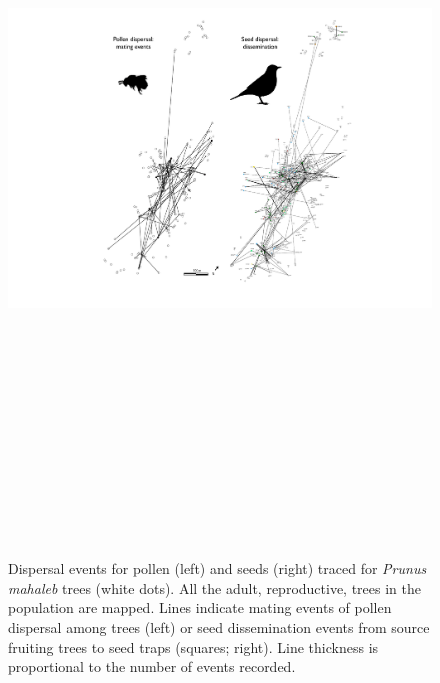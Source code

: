\documentclass[a4paper, 12pt]{article}}
\begin{document}
\begin{figure}[htbp]
\centerline{\includegraphics[height=21cm]{FigS1.pdf}}
%
\caption{Dispersal events for pollen (left) and seeds (right) traced for \textit{Prunus mahaleb} trees (white dots). All the adult, reproductive, trees in the population are mapped. Lines indicate mating events of pollen dispersal among trees (left) or seed dissemination events from source fruiting trees to seed traps (squares; right). Line thickness is proportional to the number of events recorded.}
\end{figure}

\newpage 


	
\end{document}

